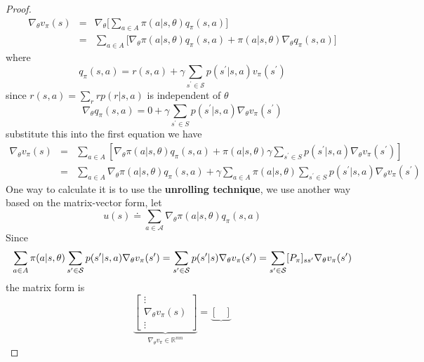 \documentclass[10pt]{elegantbook}
\begin{document}
\begin{proof}
    \begin{equation}
        \begin{array}{lll}
            \nabla_{\theta}v_{\pi}(s) &=& \nabla_{\theta}\big [\sum_{a\in A}\pi(a|s,\theta)q_{\pi}(s,a)\big ] \\
            &=& \sum_{a\in A}\big [ \nabla_{\theta}\pi(a | s,\theta)q_{\pi}(s,a)+\pi (a | s,\theta)\nabla_{\theta}q_{\pi}(s,a)\big ]
        \end{array}
    \end{equation}
    where 
    \[
        q_{\pi}(s,a)=r(s,a)+\gamma\sum_{s^{\prime}\in{\mathcal{S}}}p(s^{\prime}|s,a)v_{\pi}(s^{\prime})
    \]
    since $r(s,a)=\sum_{r}r p(r|s,a)$ is independent of $\theta$
    \[
    \nabla_{\theta}q_{\pi}(s,a)=0+\gamma\sum_{s^{\prime}\in S}p(s^{\prime}|s,a)\nabla_{\theta}v_{\pi}(s^{\prime})
    \]
    substitute this into the first equation we have
    \begin{equation}
        \begin{array}{lll}
            \nabla_{\theta}v_{\pi}(s) &=& \sum_{a\in A}\left[\nabla_{\theta}\pi(a|s,\theta)q_{\pi}(s,a)+\pi(a|s,\theta)\gamma\sum_{s^{\prime}\in S}p(s^{\prime}|s,a)\nabla_{\theta}v_{\pi}(s^{\prime})\right] \\
            &=& \sum_{a\in A}\nabla_{\theta}\pi(a|s,\theta)q_{\pi}(s,a)+\gamma\sum_{a\in A}\pi(a|s,\theta)\sum_{s^{\prime}\in S}p(s^{\prime}|s,a)\nabla_{\theta}v_{\pi}(s^{\prime})
        \end{array}
    \end{equation}
    One way to calculate it is to use the \textbf{unrolling technique}, we use another way based on the matrix-vector form, let
    \[
        u(s)\doteq\sum_{a\in\mathcal{A}}\nabla_{\theta}\pi(a|s,\theta)q_{\pi}(s,a)
    \]
    Since 
    \[
        \sum_{a\in A}\pi(a|s,\theta)\sum_{s^{\prime}\in{\cal S}}p(s^{\prime}|s,a)\nabla_{\theta}v_{\pi}(s^{\prime})
        =\sum_{s^{\prime}\in{\cal S}}p(s^{\prime}|s)\nabla_{\theta}v_{\pi}(s^{\prime})
        =\sum_{s^{\prime}\in{\cal S}}[P_{\pi}]_{s s^{\prime}}\nabla_{\theta}v_{\pi}(s^{\prime})
    \]
    the matrix form is
    \[
        \underbrace{
            \begin{bmatrix}
                \vdots \\ \nabla_{\theta}v_{\pi}(s) \\ \vdots
            \end{bmatrix}
        }_{\nabla_{\theta}v_{\pi} \in \mathbb R^{mn}}
        =
        \underbrace{
            \begin{bmatrix}

\end{bmatrix}}\]
\end{proof}
\end{document}
